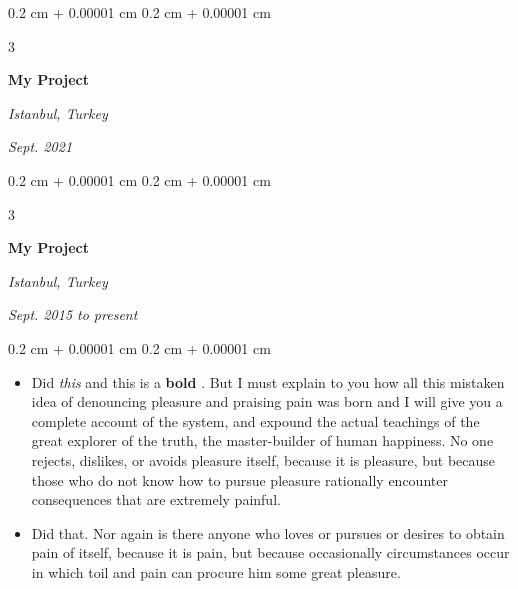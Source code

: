\documentclass[10pt, letterpaper]{article}
\newenvironment{highlights}{
    \begin{itemize}[
        topsep=0.10 cm,
        parsep=0.10 cm,
        partopsep=0pt,
        itemsep=0pt,
        leftmargin=0.4 cm + 10pt + 0.6 cm
    ]
}{
    \end{itemize}
} %
\newenvironment{onecolentry}{
    \begin{adjustwidth}{
        0.2 cm + 0.00001 cm
    }{
        0.2 cm + 0.00001 cm
    }
}{
    \end{adjustwidth}
} %
\newenvironment{threecolentry}[3][]{
    \onecolentry
    \def\thirdColumn{#3}
    \setcolumnwidth{0.6 cm, \fill, 4.5 cm}
    \begin{paracol}{3}
    #2 \switchcolumn
}{
    \switchcolumn \raggedleft \thirdColumn
    \end{paracol}
    \endonecolentry
} %
\let\hrefWithoutArrow\href
\renewcommand{\href}[2]{\hrefWithoutArrow{#1}{\mbox{\ifthenelse{\equal{#2}{}}{ }{#2 }\raisebox{.15ex}{\footnotesize \faExternalLink*}}}}
\begin{document}
        \vspace{0.2 cm-3px}

        \begin{threecolentry}{
            \vspace*{\fill}
            \textbullet
            \vspace*{3px}
            \vspace*{\fill}
        }{
        \textit{Istanbul, Turkey}    
            
        \textit{Sept. 2021}}
            \textbf{My Project}
        \end{threecolentry}



        \vspace{0.2 cm-3px}

        \begin{threecolentry}{
            \vspace*{\fill}
            \textbullet
            \vspace*{3px}
            \vspace*{\fill}
        }{
        \textit{Istanbul, Turkey}    
            
        \textit{Sept. 2015 to present}}
            \textbf{My Project}
        \end{threecolentry}

        \vspace{0.10 cm-3px}
        \begin{onecolentry}
            \begin{highlights}
                \item Did \textit{this} and this is a \textbf{bold} \href{https://example.com}{link}. But I must explain to you how all this mistaken idea of denouncing pleasure and praising pain was born and I will give you a complete account of the system, and expound the actual teachings of the great explorer of the truth, the master-builder of human happiness. No one rejects, dislikes, or avoids pleasure itself, because it is pleasure, but because those who do not know how to pursue pleasure rationally encounter consequences that are extremely painful.
                \item Did that. Nor again is there anyone who loves or pursues or desires to obtain pain of itself, because it is pain, but because occasionally circumstances occur in which toil and pain can procure him some great pleasure.
            \end{highlights}
        \end{onecolentry}
\end{document}
